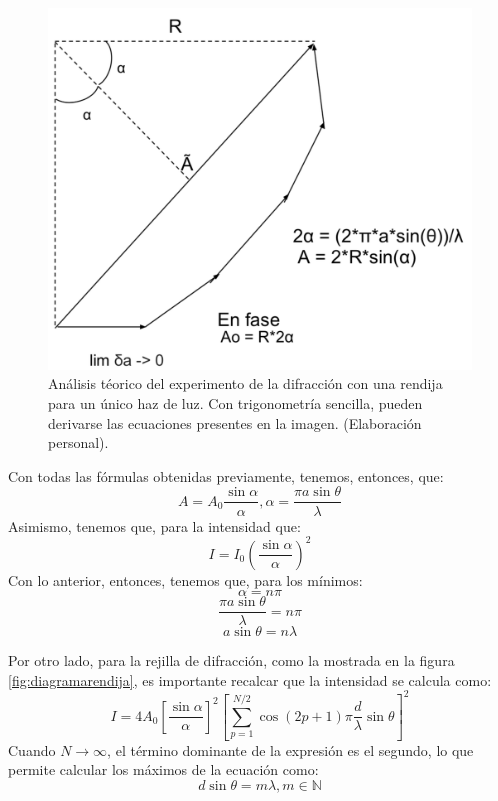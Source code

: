 \documentclass[%
 reprint,
 amsmath,amssymb,
 aps,
]{revtex4-1}
\begin{document}
\begin{figure}[H]
    \centering
    \includegraphics[scale= 0.4]{barco.png}
    \caption{Análisis téorico del experimento de la difracción con una rendija para un único haz de luz. Con trigonometría sencilla, pueden derivarse las ecuaciones presentes en la imagen. (Elaboración personal).}
    \label{fig:figBarco}
\end{figure}
Con todas las fórmulas obtenidas previamente, tenemos, entonces, que:
\begin{equation}
    A = A_{0}\frac{\sin{\alpha}}{\alpha}, \alpha = \frac{\pi a \sin{\theta}}{\lambda}
\end{equation}
Asimismo, tenemos que, para la intensidad que:
\begin{equation}
    I = I_{0}(\frac{\sin{\alpha}}{\alpha})^{2}
\end{equation}
Con lo anterior, entonces, tenemos que, para los mínimos:
\begin{equation}
    \alpha = n\pi
\end{equation}
\begin{equation}
  \frac{\pi a \sin{\theta}}{\lambda} = n\pi
\end{equation}
\begin{equation}
    a\sin{\theta}=n\lambda
\end{equation}

Por otro lado, para la rejilla de difracción, como la mostrada en la figura \ref{fig:diagramarendija}, es importante recalcar que la intensidad se calcula como:
\begin{equation}\label{intensidad}
    I = 4A_{0}[\frac{\sin{\alpha}}{\alpha}]^{2}[\sum_{p=1}^{N/2}\cos{(2p+1)\pi \frac{d}{\lambda}} \sin{\theta}]^2
\end{equation}
Cuando $N \longrightarrow \infty$, el término dominante de la expresión es el segundo, lo que permite calcular los máximos de la ecuación como:
\begin{equation}
    d\sin{\theta} = m \lambda, m \in \mathds{N}
\end{equation}
\end{document}
